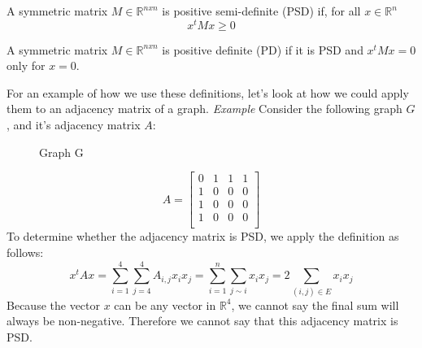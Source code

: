 \documentclass{article}
\begin{document}
    \theoremstyle{definition}
    \begin{definition}
    A symmetric matrix $M \in \mathbb{R}^{nxn}$ is positive semi-definite (PSD) if, for all $x \in \mathbb{R}^{n}$
    $$x^{t}Mx \geq 0$$
    \end{definition}
    \begin{definition}
    A symmetric matrix $M \in \mathbb{R}^{nxn}$ is positive definite (PD) if it is PSD and $x^{t}Mx = 0$ only for $x=0$.
    \end{definition}
    
    For an example of how we use these definitions, let's look at how we could apply them to an adjacency matrix of a graph.
    \newline
    \textit{Example} 
    \newline
    Consider the following graph $G$, and it's adjacency matrix $A$:
    \begin{figure}[h!]
        \begin{center}
        \end{center}
        \caption{Graph G}
    \end{figure}
    $$A = \begin{bmatrix}
            0 & 1 & 1 & 1 \\
            1 & 0 & 0 & 0 \\
            1 & 0 & 0 & 0 \\
            1 & 0 & 0 & 0 \\
        \end{bmatrix}$$
    To determine whether the adjacency matrix is PSD, we apply the definition as follows:
    $$x^{t}Ax = \sum_{i=1}^{4}\sum_{j=4}^{4}A_{i,j}x_{i}x_{j} = \sum_{i=1}^{n}\sum_{j\sim i}x_i x_j = 2\sum_{(i,j)\in E}x_i x_j$$
    Because the vector $x$ can be any vector in $\mathbb{R}^4$, we cannot say the final sum will always be non-negative. Therefore we cannot say that this adjacency matrix is PSD.
    
\end{document}
